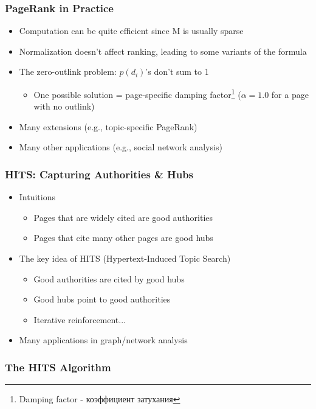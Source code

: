 \subsubsection{PageRank in Practice}
\begin{itemize}
\item Computation can be quite efficient since M is usually sparse
\item Normalization doesn’t affect ranking, leading to some variants of the formula

\item The zero-outlink problem: $p(d_i)$’s don’t sum to 1
\begin{itemize}
\item One possible solution = page-specific damping factor\footnote{Damping factor - коэффициент затухания}
($\alpha=1.0$ for a page with no outlink)
\end{itemize}
\item Many extensions (e.g., topic-specific PageRank)
\item Many other applications (e.g., social network analysis)
\end{itemize}


\subsubsection{HITS: Capturing Authorities \& Hubs}
\begin{itemize}
\item Intuitions
\begin{itemize}
\item Pages that are widely cited are good authorities 
\item Pages that cite many other pages are good hubs
\end{itemize}

\item The key idea of HITS (Hypertext-Induced Topic Search) 
\begin{itemize}
\item Good authorities are cited by good hubs
\item Good hubs point to good authorities
\item Iterative reinforcement...
\end{itemize}

\item Many applications in graph/network analysis
\end{itemize}


\subsubsection{The HITS Algorithm}

